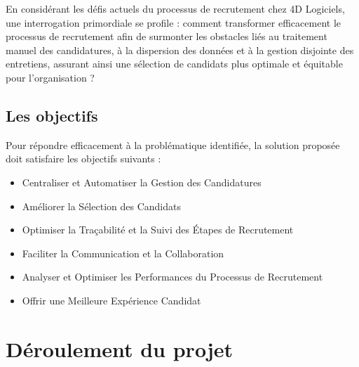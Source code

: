 En considérant les défis actuels du processus de recrutement chez
 4D Logiciels, une interrogation primordiale se profile : 
 comment transformer efficacement le processus de recrutement 
 afin de surmonter les obstacles liés au traitement manuel des 
 candidatures, à la dispersion des données et à la gestion 
 disjointe des entretiens, assurant ainsi une sélection de 
 candidats plus optimale et équitable pour l'organisation ?


\subsection{Les objectifs}

Pour répondre efficacement à la problématique identifiée,
la solution proposée doit satisfaire les objectifs suivants :

\begin{itemize}
    \item Centraliser et Automatiser la Gestion des Candidatures
    \item Améliorer la Sélection des Candidats 
    \item Optimiser la Traçabilité et la Suivi des Étapes de Recrutement 
    \item Faciliter la Communication et la Collaboration 
    \item Analyser et Optimiser les Performances du Processus de Recrutement 
    \item Offrir une Meilleure Expérience Candidat 
\end{itemize}

\section{Déroulement du projet}





